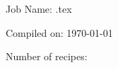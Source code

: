 \documentclass[10pt, twoside]{book}
\begin{document}

\cleardoublepage
\pagestyle{empty}
\bgroup
\ttfamily
\parindent=0pt
Job Name: \jobname\relax.tex

Compiled on: \today

Number of recipes: \the\drinks

\egroup
\end{document}
